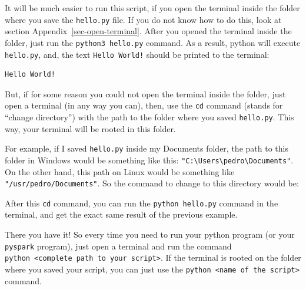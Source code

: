 \documentclass[
  11pt,
  letterpaper,
  DIV=11,
  numbers=noendperiod]{scrreprt}
\newenvironment{Shaded}{\begin{snugshade}}{\end{snugshade}}
\newcommand{\NormalTok}[1]{\textcolor[rgb]{0.00,0.23,0.31}{#1}}
\begin{document}
It will be much easier to run this script, if you open the terminal
inside the folder where you save the \texttt{hello.py} file. If you do
not know how to do this, look at section
Appendix~\ref{sec-open-terminal}. After you opened the terminal inside
the folder, just run the \texttt{python3\ hello.py} command. As a
result, python will execute \texttt{hello.py}, and, the text
\texttt{Hello\ World!} should be printed to the terminal:

\begin{Shaded}
\end{Shaded}

\begin{verbatim}
Hello World!
\end{verbatim}

But, if for some reason you could not open the terminal inside the
folder, just open a terminal (in any way you can), then, use the
\texttt{cd} command (stands for ``change directory'') with the path to
the folder where you saved \texttt{hello.py}. This way, your terminal
will be rooted in this folder.

For example, if I saved \texttt{hello.py} inside my Documents folder,
the path to this folder in Windows would be something like this:
\texttt{"C:\textbackslash{}Users\textbackslash{}pedro\textbackslash{}Documents"}.
On the other hand, this path on Linux would be something like
\texttt{"/usr/pedro/Documents"}. So the command to change to this
directory would be:

\begin{Shaded}
\end{Shaded}

After this \texttt{cd} command, you can run the
\texttt{python\ hello.py} command in the terminal, and get the exact
same result of the previous example.

There you have it! So every time you need to run your python program (or
your \texttt{pyspark} program), just open a terminal and run the command
\texttt{python\ \textless{}complete\ path\ to\ your\ script\textgreater{}}.
If the terminal is rooted on the folder where you saved your script, you
can just use the
\texttt{python\ \textless{}name\ of\ the\ script\textgreater{}} command.
\end{document}
